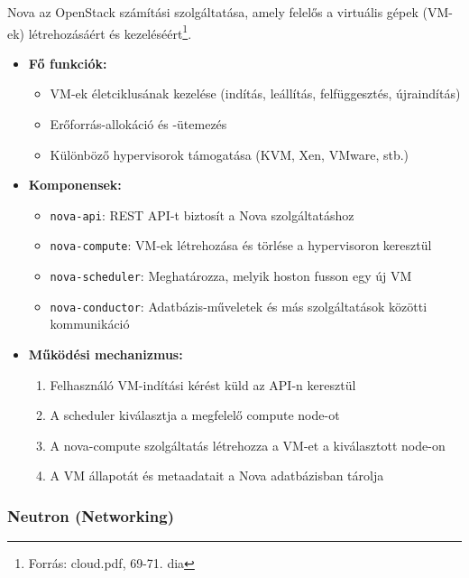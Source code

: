 \documentclass[a4paper,12pt]{article}
\begin{document}
    Nova az OpenStack számítási szolgáltatása, amely felelős a virtuális gépek (VM-ek) létrehozásáért és kezeléséért\footnote{Forrás: cloud.pdf, 69-71. dia}.

    \begin{itemize}
        \item \textbf{Fő funkciók:}
        \begin{itemize}
            \item VM-ek életciklusának kezelése (indítás, leállítás, felfüggesztés, újraindítás)
            \item Erőforrás-allokáció és -ütemezés
            \item Különböző hypervisorok támogatása (KVM, Xen, VMware, stb.)
        \end{itemize}

        \item \textbf{Komponensek:}
        \begin{itemize}
            \item \texttt{nova-api}: REST API-t biztosít a Nova szolgáltatáshoz
            \item \texttt{nova-compute}: VM-ek létrehozása és törlése a hypervisoron keresztül
            \item \texttt{nova-scheduler}: Meghatározza, melyik hoston fusson egy új VM
            \item \texttt{nova-conductor}: Adatbázis-műveletek és más szolgáltatások közötti kommunikáció
        \end{itemize}

        \item \textbf{Működési mechanizmus:}
        \begin{enumerate}
            \item Felhasználó VM-indítási kérést küld az API-n keresztül
            \item A scheduler kiválasztja a megfelelő compute node-ot
            \item A nova-compute szolgáltatás létrehozza a VM-et a kiválasztott node-on
            \item A VM állapotát és metaadatait a Nova adatbázisban tárolja
        \end{enumerate}
    \end{itemize}

    \subsubsection{Neutron (Networking)}
\end{document}
